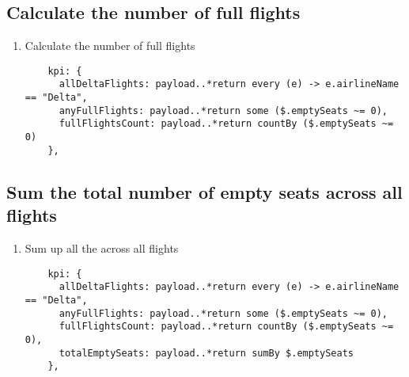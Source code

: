 \subsection{Calculate the number of full flights}
\begin{enumerate}[resume*]
\item Calculate the number of full flights
  \begin{lstlisting}
    kpi: {
      allDeltaFlights: payload..*return every (e) -> e.airlineName == "Delta",
      anyFullFlights: payload..*return some ($.emptySeats ~= 0),
      fullFlightsCount: payload..*return countBy ($.emptySeats ~= 0)
    },
  \end{lstlisting}
\end{enumerate}

\subsection{Sum the total number of empty seats across all flights}
\begin{enumerate}[resume*]
\item Sum up all the  across all flights
  \begin{lstlisting}
    kpi: {
      allDeltaFlights: payload..*return every (e) -> e.airlineName == "Delta",
      anyFullFlights: payload..*return some ($.emptySeats ~= 0),
      fullFlightsCount: payload..*return countBy ($.emptySeats ~= 0),
      totalEmptySeats: payload..*return sumBy $.emptySeats
    },    
  \end{lstlisting}
\end{enumerate}

